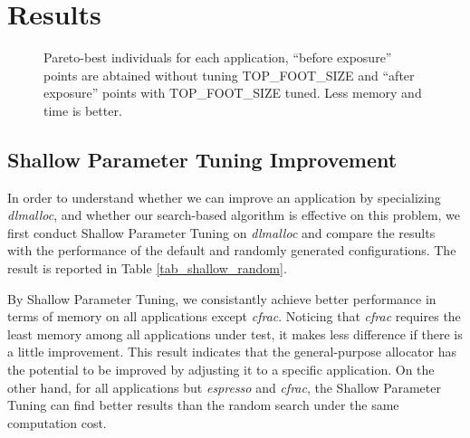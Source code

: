 
\section{Results}

\begin{figure*}[htbp]
	\centering
	\caption{Pareto-best individuals for each application, ``before exposure'' points are abtained without tuning TOP\_FOOT\_SIZE and ``after exposure'' points with TOP\_FOOT\_SIZE tuned. Less memory and time is better.}\label{fig_10}
\end{figure*}

\subsection{Shallow Parameter Tuning Improvement}

\begin{table}[hbtp]
\centering
\caption{Least memory consumption found by Shallow Parameter Tuning and Random Search (**waiting for results)}
\label{tab_shallow_random}
\end{table}

In order to understand whether we can improve an application by specializing \emph{dlmalloc}, and whether our search-based algorithm is effective on this problem, we first conduct Shallow Parameter Tuning on \emph{dlmalloc} and compare the results with the performance of the default and randomly generated configurations. The result is reported in Table \ref{tab_shallow_random}. 

By Shallow Parameter Tuning, we consistantly achieve better performance in terms of memory on all applications except \emph{cfrac}. Noticing that \emph{cfrac} requires the least memory among all applications under test, it makes less difference if there is a little improvement. This result indicates that the general-purpose allocator has the potential to be improved by adjusting it to a specific application. On the other hand, for all applications but \emph{espresso} and \emph{cfrac}, the Shallow Parameter Tuning can find better results than the random search under the same computation cost. 

